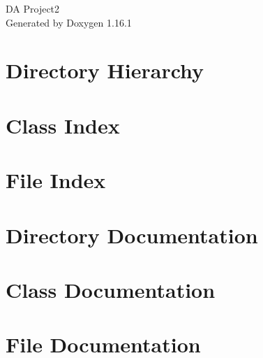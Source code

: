 \documentclass[twoside]{book}
\newcommand{\+}{\discretionary{\mbox{\scriptsize$\hookleftarrow$}}{}{}}
\newcommand{\clearemptydoublepage}{%
    \newpage{\pagestyle{empty}\cleardoublepage}%
  }
\begin{document}
  \raggedbottom
    \hypersetup{pageanchor=false,
                bookmarksnumbered=true,
                pdfencoding=unicode
               }
  \begin{titlepage}
  \vspace*{7cm}
  \begin{center}%
  {\Large DA Project2}\\
  \vspace*{1cm}
  {\large Generated by Doxygen 1.16.1}\\
  \end{center}
  \end{titlepage}
  \clearemptydoublepage
  \tableofcontents
  \clearemptydoublepage
  \hypersetup{pageanchor=true}
\chapter{Directory Hierarchy}

\chapter{Class Index}

\chapter{File Index}

\chapter{Directory Documentation}

\chapter{Class Documentation}










\chapter{File Documentation}























  \backmatter
  \newpage
  \clearemptydoublepage
  \printindex
\end{document}
